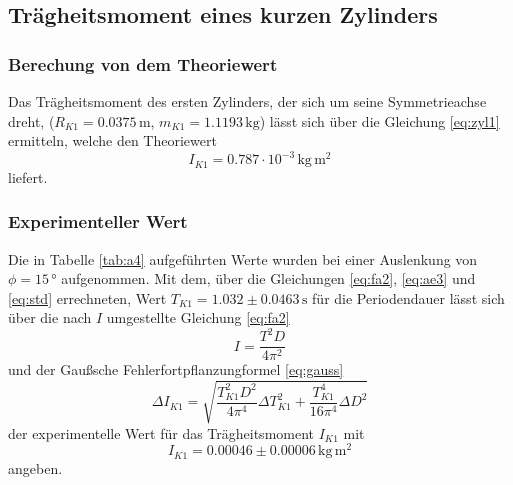 \subsection{Trägheitsmoment eines kurzen Zylinders}



\subsubsection{Berechung von dem Theoriewert}

Das Trägheitsmoment des ersten Zylinders, der sich um seine Symmetrieachse dreht,
($R_{K1} = 0.0375\, \si{\meter}$, $m_{K1} = 1.1193\, \si{\kilogram}$) 
lässt sich über die Gleichung \ref{eq:zyl1} ermitteln, welche den Theoriewert 
\begin{equation}
    I_{K1} = 0.787\cdot 10^{-3}\, \si{\kilogram}\,\si{\meter}^2 \nonumber
\end{equation} 
\noindent
liefert.



\subsubsection{Experimenteller Wert}

Die in Tabelle \ref{tab:a4} aufgeführten Werte wurden bei einer 
Auslenkung von $\phi = 15\,°$ aufgenommen. Mit dem, über die Gleichungen \ref{eq:fa2},
\ref{eq:ae3} und \ref{eq:std} 
errechneten, Wert $T_{K1} = 1.032 \pm 0.0463\, \si{\second}$
für die Periodendauer lässt sich über die nach $I$ umgestellte Gleichung \ref{eq:fa2}
\begin{equation}
    I = \frac{T^2 D}{4 \pi^2}
\end{equation}
und der Gaußsche Fehlerfortpflanzungformel \ref{eq:gauss}
\begin{equation} 
    \Delta I_{K1} = \sqrt{\frac{T_{K1}^2 D^2}{4 \pi^4}\Delta T_{K1}^2 + \frac{T_{K1}^4}{16 \pi^4}\Delta D^2} 
\end{equation}
\noindent
der experimentelle Wert für das Trägheitsmoment $I_{K1}$ mit
\begin{equation}
    I_{K1} = 0.00046 \pm 0.00006\, \si{\kilogram}\,\si{\meter\squared}
\end{equation}
\noindent
angeben.

